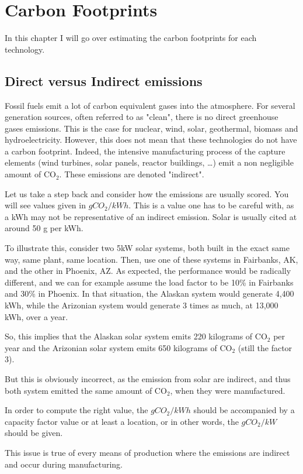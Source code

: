 \setchapterpreamble[u]{\margintoc}
\chapter{Carbon Footprints}

In this chapter I will go over estimating the carbon footprints for each technology.



\section{Direct versus Indirect emissions}

Fossil fuels emit a lot of carbon equivalent gases into the atmosphere. For several generation sources, often referred to as "clean", there is no direct greenhouse gases emissions. This is the case for nuclear, wind, solar, geothermal, biomass and hydroelectricity. However, this does not mean that these technologies do not have a carbon footprint. Indeed, the intensive manufacturing process of the capture elements (wind turbines, solar panels, reactor buildings, \ldots) emit a non negligible amount of $\mathrm{CO_2}$. These emissions are denoted "indirect".

\begin{kaobox}[frametitle=A look at some values]

Let us take a step back and consider how the emissions are usually scored. You will see values given in $gCO_2/kWh$. This is a value one has to be careful with, as a kWh may not be representative of an indirect emission. Solar is usually cited at around 50 g per kWh.

To illustrate this, consider two 5kW solar systems, both built in the exact same way, same plant, same location. Then, use one of these systems in Fairbanks, AK, and the other in Phoenix, AZ. As expected, the performance would be radically different, and we can for example assume the load factor to be 10\% in Fairbanks and 30\% in Phoenix. In that situation, the Alaskan system would generate 4,400 kWh, while the Arizonian system would generate 3 times as much, at 13,000 kWh, over a year.

So, this implies that the Alaskan solar system emits 220 kilograms of $\mathrm{CO_2}$
per year and the Arizonian solar system emits 650 kilograms of $\mathrm{CO_2}$ (still the factor 3).

But this is obviously incorrect, as the emission from solar are indirect, and thus both system emitted the same amount of $\mathrm{CO_2}$, when they were manufactured.

In order to compute the right value, the $gCO_2/kWh$ should be accompanied by a capacity factor value or at least a location, or in other words, the $gCO_2/kW$ should be given.

This issue is true of every means of production where the emissions are indirect and occur during manufacturing.

\end{kaobox}

